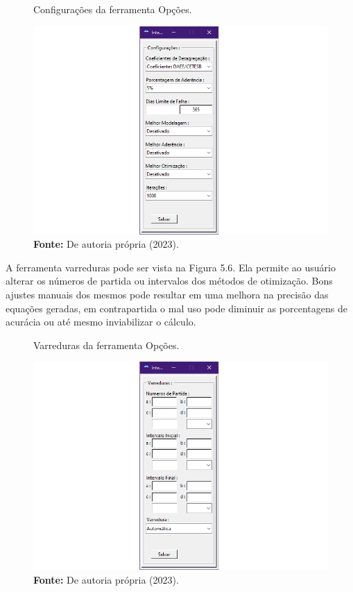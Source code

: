 \newpage

\begin{figure}[!ht]
	\centering
	\caption{Configurações da ferramenta Opções.}
	\includegraphics[width=.7615\linewidth]{figuras/configuracoes.png}
	\caption*{\textbf{Fonte:} De autoria própria (2023).}
	\label{fig:figuras/configuracoes.png}
\end{figure}

A ferramenta varreduras pode ser vista na Figura 5.6. Ela permite ao usuário alterar os números de partida ou intervalos dos métodos de otimização. Bons ajustes manuais dos mesmos pode resultar em uma melhora na precisão das equações geradas, em contrapartida o mal uso pode diminuir as porcentagens de acurácia ou até mesmo inviabilizar o cálculo.\bigskip

\begin{figure}[!ht]
	\centering
	\caption{Varreduras da ferramenta Opções.}
	\includegraphics[width=.7615\linewidth]{figuras/varreduras.png}
	\caption*{\textbf{Fonte:} De autoria própria (2023).}
	\label{fig:figuras/varreduras.png}
\end{figure}

\newpage

